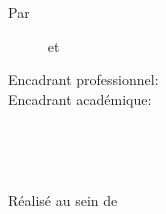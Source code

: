 \begin{center}
\textrm{Par}\\
\vskip0.3cm
{
    {%
        \begin{center}
            \large\textbf{\@author}~~~~~ et ~~~~~
            \large\textbf{\@secondAuthor}
        \end{center}
    }
    {\Large\textbf{\@author}}%
}
\vskip12mm

\begin{changemargin}{-9mm}{0cm}
\begin{minipage}[l]{1.1\columnwidth}
\begin{tcolorbox}[colback=white,boxrule=0pt,toprule=3pt,bottomrule=3pt,arc=0pt,top=0mm,right=0mm,left=0mm,bottom=0mm,boxsep=0.5mm]{
    \begin{tcolorbox}[colback=white, boxrule=0pt,toprule=1pt,bottomrule=1pt,arc=0pt,enlarge bottom by=-0.9mm, auto outer arc]
        \centering
        {\huge\textbf{\@title}}
    \end{tcolorbox}
}
\end{tcolorbox}
\end{minipage}
\end{changemargin}

\end{center}
\vskip8mm%

\begin{center}
\large
\begin{minipage}[c]{0.28\columnwidth}
Encadrant professionnel:\\
Encadrant académique:
\end{minipage}
\hfill
\begin{minipage}[c]{0.42\columnwidth}
\textbf{\@proFramerName}\\
\textbf{\@academicFramerName}
\end{minipage}
\hfill
\begin{minipage}[c]{0.26\columnwidth}
\@proFramerSpeciality\\
\@academicFramerSpeciality
\end{minipage}
\end{center}
\vskip16mm

\begin{center}
\large
Réalisé au sein de \@companyName\\
\vskip0.4cm
\begin{figure}[h]
\centering
{{\fboxrule=2.5pt}}
\end{figure}
\end{center}

\restoregeometry